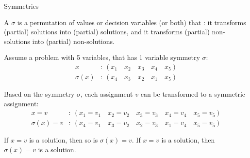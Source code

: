 \documentclass{cons-beamer}
\begin{document}
\begin{frame}{Symmetries}
  \begin{definition}%
    A  $\sigma$ is a permutation of values or decision variables (or both) that : it transforms (partial) solutions into (partial) solutions, and it transforms (partial) non-solutions into (partial) non-solutions.
  \end{definition}

  \begin{example}
    \footnotesize
    Assume a problem with 5 variables, that has 1 variable symmetry $\sigma$:
    \begin{align}
      x &: \ (x_1 \quad x_2 \quad x_3 \quad x_4 \quad x_5) \\
      \sigma(x) &: \ (x_4 \quad x_3 \quad x_2 \quad x_1 \quad x_5)
    \end{align}

    Based on the symmetry $\sigma$, each assignment $v$ can be transformed to a symmetric assignment:
    \begin{align}
      x = v &: \ (x_1 = v_1 \quad x_2 = v_2 \quad x_3 = v_3 \quad x_4 = v_ 4 \quad x_5 = v_5 ) \\
      \sigma(x) = v &: \ (x_4 = v_1 \quad x_3 = v_2 \quad x_2 = v_3 \quad x_1 = v_4 \quad x_5 = v_5)
    \end{align}

    If $x = v$ is a solution, then so is $\sigma(x) = v$.
    If $x = v$ is  a solution, then $\sigma(x) = v$ is  a solution.




  \end{example}
\end{frame}
\end{document}
